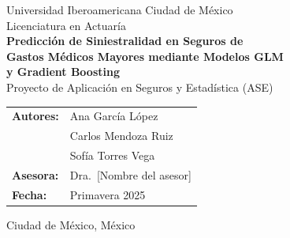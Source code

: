\documentclass[12pt, a4paper]{article}
\begin{document}

\begin{titlepage}
  \centering
  \vspace*{1cm}
  {\large Universidad Iberoamericana Ciudad de México\\
  Licenciatura en Actuaría}\\[1cm]

  {\LARGE \textbf{Predicción de Siniestralidad en Seguros de\\
  Gastos Médicos Mayores mediante Modelos GLM\\
  y Gradient Boosting}}\\[1.5cm]

  {\large Proyecto de Aplicación en Seguros y Estadística (ASE)}\\[2cm]

  \begin{tabular}{ll}
    \textbf{Autores:} & Ana García López \\
                      & Carlos Mendoza Ruiz \\
                      & Sofía Torres Vega \\[0.5cm]
    \textbf{Asesora:} & Dra.\ [Nombre del asesor] \\[0.5cm]
    \textbf{Fecha:}   & Primavera 2025
  \end{tabular}

  \vfill
  {\small Ciudad de México, México}
\end{titlepage}

\begin{abstract}
Este trabajo analiza la siniestralidad de una cartera de seguros de Gastos Médicos Mayores (GMM) en México durante el periodo 2019–2023. Se comparan modelos actuariales clásicos —modelo compuesto frecuencia-severidad con distribuciones Poisson y Gamma— frente a modelos de gradiente extremo (XGBoost) para la predicción de la prima pura. Los resultados muestran que el modelo compuesto XGBoost reduce el RMSE en un 13.7\% respecto al GLM clásico, con mejoras notables en carteras de asegurados jóvenes. Se discuten las implicaciones para la tarificación y el cálculo de reservas en el mercado asegurador mexicano.

\medskip
\noindent\textbf{Palabras clave:} siniestralidad, gastos médicos mayores, GLM Poisson-Gamma, XGBoost, tarificación, prima pura.
\end{abstract}

\tableofcontents
\newpage










\end{document}
